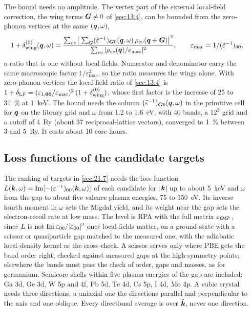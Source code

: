 The bound needs no amplitude. The vertex part of the external local-field correction, the wing terms $\bm{G} \neq 0$ of \cref{sec:13.4}, can be bounded from the zero-phonon vertices at the same $(\bm{q},\omega)$,
\begin{equation}
  1 + \delta_{\mathrm{wing}}^{(0)}(\bm{q},\omega) = \frac{\sum_{cv}\big|\sum_{\bm{G}}(\tilde\varepsilon^{-1})_{\bm{G}0}(\bm{q},\omega)\,\rho_{cv}(\bm{q}+\bm{G})\big|^2}{\sum_{cv}|\rho_{cv}(\bm{q})/\varepsilon_{\mathrm{mac}}|^2} , \qquad \varepsilon_{\mathrm{mac}} = 1/(\tilde\varepsilon^{-1})_{00} ,
  \label{eq:E.16-dLF}
\end{equation}
a ratio that is one without local fields. Numerator and denominator carry the same macroscopic factor $1/\varepsilon_{\mathrm{mac}}^2$, so the ratio measures the wings alone. With zero-phonon vertices the local-field ratio of \cref{sec:13.4} is $1 + \delta_{\mathrm{LF}} = (\varepsilon_{1,\bm{0}\bm{0}}/\varepsilon_{\mathrm{mac}})^2\,(1 + \delta_{\mathrm{wing}}^{(0)})$, whose first factor is the increase of 25 to \SI{31}{\percent} at \SI{1}{keV}. The bound needs the column $(\tilde\varepsilon^{-1})_{\bm{G}0}(\bm{q},\omega)$ in the primitive cell for $\bm{q}$ on the library grid and $\omega$ from 1.2 to \SI{1.6}{eV}, with 40 bands, a $12^3$ grid and a cutoff of \SI{4}{Ry} (about 37 reciprocal-lattice vectors), converged to \SI{1}{\percent} between 3 and \SI{5}{Ry}. It costs about 10 core-hours.

\subsection{Loss functions of the candidate targets}

The ranking of targets in \cref{sec:21.7} needs the loss function $L(\bm{k},\omega) = \operatorname{Im}[-(\varepsilon^{-1})_{00}(\bm{k},\omega)]$ of each candidate for $|\bm{k}|$ up to about \SI{5}{keV} and $\omega$ from the gap to about five valence plasma energies, 75 to \SI{150}{eV}. Its inverse fourth moment in $\omega$ sets the Migdal yield, and its weight near the gap sets the electron-recoil rate at low mass. The level is RPA with the full matrix $\varepsilon_{\bm{G}\bm{G}'}$, since $L$ is not $\operatorname{Im}\varepsilon_{00}/|\varepsilon_{00}|^2$ once local fields matter, on a ground state with a scissor or quasiparticle gap matched to the measured one, with the adiabatic local-density kernel as the cross-check. A scissor serves only where PBE gets the band order right, checked against measured gaps at the high-symmetry points; elsewhere the bands must pass the check of order, gaps and masses, as for germanium. Semicore shells within five plasma energies of the gap are included: Ga 3d, Ge 3d, W 5p and 4f, Pb 5d, Te 4d, Cs 5p, I 4d, Mo 4p. A cubic crystal needs three directions, a uniaxial one the directions parallel and perpendicular to the axis and one oblique. Every directional average is over $\hat{\bm{k}}$, never one direction.

